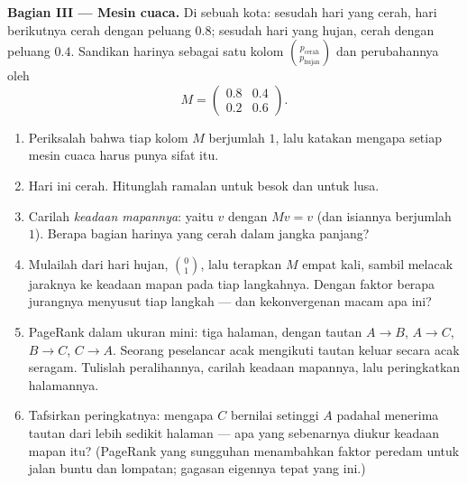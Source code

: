 \begin{problem}
\medskip
\noindent\textbf{Bagian III --- Mesin cuaca.}
Di sebuah kota: sesudah hari yang cerah, hari berikutnya cerah dengan
peluang $0.8$; sesudah hari yang hujan, cerah dengan peluang
$0.4$. Sandikan  harinya sebagai satu kolom
$\binom{p_{\text{cerah}}}{p_{\text{hujan}}}$ dan perubahannya oleh
\[
M = \begin{pmatrix} 0.8 & 0.4\\ 0.2 & 0.6 \end{pmatrix}.
\]
\begin{enumerate}[resume]
  \item Periksalah bahwa tiap kolom $M$ berjumlah $1$, lalu katakan mengapa
        setiap mesin cuaca harus punya sifat itu.
  \item Hari ini cerah. Hitunglah ramalan untuk besok dan
        untuk lusa.
  \item Carilah \emph{keadaan mapannya}: yaitu  $v$ dengan
        $Mv = v$ (dan isiannya berjumlah $1$). Berapa bagian
        harinya yang cerah dalam jangka panjang?
  \item Mulailah dari hari hujan, $\binom01$, lalu terapkan $M$ empat
        kali, sambil melacak jaraknya ke keadaan mapan pada
        tiap langkahnya. Dengan faktor berapa jurangnya menyusut tiap langkah
        --- dan kekonvergenan macam apa ini?
  \item PageRank dalam ukuran mini: tiga halaman, dengan tautan
        $A \to B$, $A \to C$, $B \to C$, $C \to A$. Seorang peselancar
        acak mengikuti tautan keluar secara acak seragam.
        Tulislah  peralihannya, carilah keadaan mapannya, lalu
        peringkatkan halamannya.
  \item Tafsirkan peringkatnya: mengapa $C$ bernilai setinggi
        $A$ padahal menerima tautan dari lebih sedikit halaman --- apa
        yang sebenarnya diukur keadaan mapan itu? (PageRank yang sungguhan
        menambahkan faktor peredam untuk jalan buntu dan lompatan; gagasan
         eigennya tepat yang ini.)
\end{enumerate}


\end{problem}
